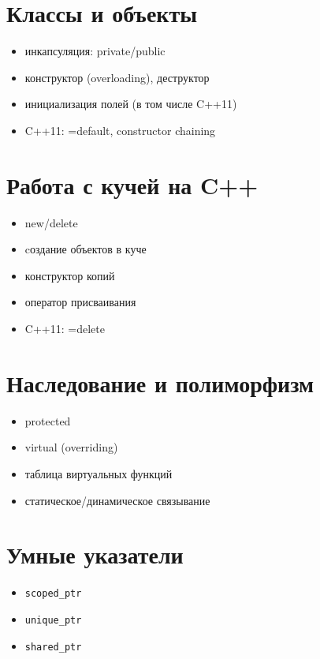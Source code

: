 \section{Классы и объекты}
\begin{itemize}
    \item инкапсуляция: private/public
    \item конструктор (overloading), деструктор
    \item инициализация полей (в том числе C++11)
    \item C++11: =default, constructor chaining
\end{itemize}
\section{Работа с кучей на C++}
\begin{itemize}
    \item new/delete
    \item cоздание объектов в куче
    \item конструктор копий
    \item оператор присваивания
    \item C++11: =delete
\end{itemize}
\section{Наследование и полиморфизм}
\begin{itemize}
    \item protected
    \item virtual (overriding)
    \item таблица виртуальных функций
    \item статическое/динамическое связывание
\end{itemize}
\section{Умные указатели}
\begin{itemize}
    \item \begin{verbatim}scoped_ptr \end{verbatim}
    \item \begin{verbatim}unique_ptr \end{verbatim}
    \item \begin{verbatim}shared_ptr \end{verbatim}
\end{itemize}

